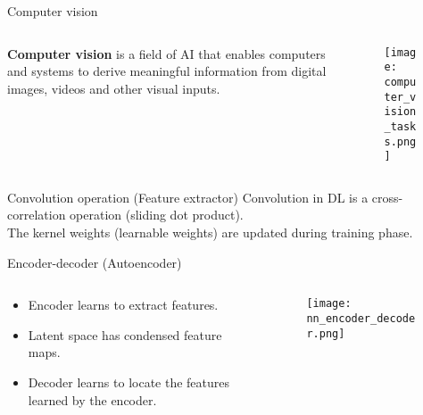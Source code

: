 \documentclass[10pt,aspectratio=169,dvipsnames]{beamer} %
\begin{document}
	\setcounter{subfigure}{0}
	\begin{frame}{Computer vision}
		\begin{columns}[T]
			\begin{column}[c]{0.27\textwidth}
				\justifying
				\alert {\textbf{Computer vision}} is a field of AI that enables computers and systems to derive meaningful information from digital images, videos and other visual inputs. 
			\end{column}
			\quad
			\begin{column}[c]{0.7\textwidth}
				\begin{figure}
					\centering
					\texttt{[image: computer\_vision\_tasks.png]}
				\end{figure}
			\end{column}
		\end{columns}
	\end{frame}
	\note{
		
	}
	\begin{frame}{Convolution operation (Feature extractor)}
		\noindent Convolution in DL is a cross-correlation operation \alert{(sliding dot product)}. \\
		The kernel weights \alert{(learnable weights)} are updated during training phase.
		\begin{figure}[t]
			\centering
		\end{figure}
	\end{frame}
	\setcounter{subfigure}{0}
	\begin{frame}{Encoder-decoder (Autoencoder)}
		\begin{columns}[T]
			\begin{column}[t]{.35\textwidth}
				\begin{itemize}
					\item \alert{Encoder} learns to extract features.
					\item \alert{Latent space} has condensed feature maps.
					\item \alert{Decoder} learns to locate the features learned by the encoder.
				\end{itemize}	
			\end{column}
			\hfill
			\begin{column}[t]{.6\textwidth}
				\begin{figure}
					\centering
					\texttt{[image: nn\_encoder\_decoder.png]}
				\end{figure}	
			\end{column}
		\end{columns}			
	\end{frame}
\end{document}
